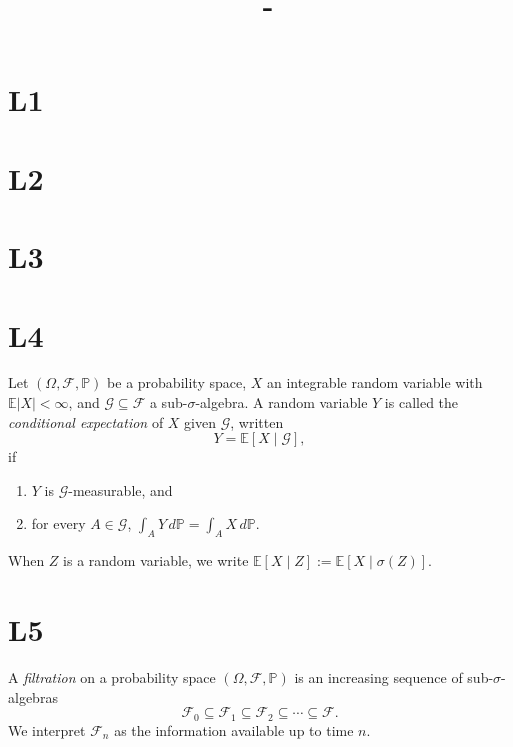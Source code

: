 \documentclass[answers,12pt,addpoints]{exam}
\author{\name}
\title{\course \ - \assignment}
\begin{document}
\maketitle
\tableofcontents
\newpage
\section{L1}

\section{L2}

\section{L3}

\section{L4}

\begin{definition}
Let $(\Omega,\mathcal{F},\mathbb{P})$ be a probability space, $X$ an integrable random variable with $\mathbb{E}|X|<\infty$, and $\mathcal{G}\subseteq\mathcal{F}$ a sub-$\sigma$-algebra. A random variable $Y$ is called the \emph{conditional expectation} of $X$ given $\mathcal{G}$, written
\[
Y = \mathbb{E}[X \mid \mathcal{G}],
\]
if
\begin{enumerate}
  \item $Y$ is $\mathcal{G}$-measurable, and
  \item for every $A\in\mathcal{G}$, $\displaystyle \int_A Y\,d\mathbb{P} = \int_A X\,d\mathbb{P}$.
\end{enumerate}
When $Z$ is a random variable, we write $\mathbb{E}[X\mid Z] := \mathbb{E}[X\mid \sigma(Z)]$.
\end{definition}

\section{L5}

\begin{definition}[Filtration]
A \emph{filtration} on a probability space $(\Omega,\mathcal{F},\mathbb{P})$ is an increasing sequence of sub-$\sigma$-algebras
\[
\mathcal{F}_0 \subseteq \mathcal{F}_1 \subseteq \mathcal{F}_2 \subseteq \cdots \subseteq \mathcal{F}.
\]
We interpret $\mathcal{F}_n$ as the information available up to time $n$.
\end{definition}
\end{document}
